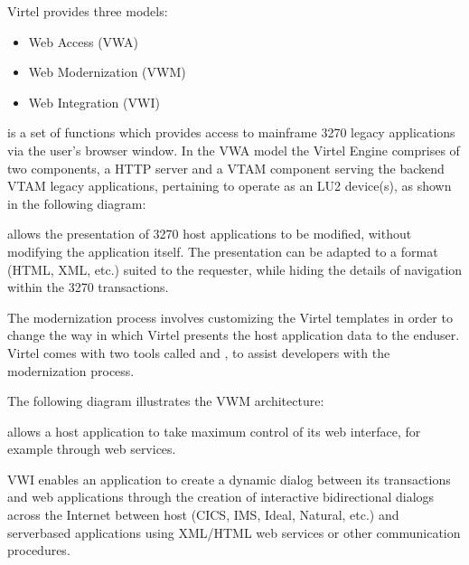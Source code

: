 \documentclass[letterpaper,10pt,english]{sphinxmanual}
\begin{document}
\sphinxAtStartPar
Virtel provides three models:
\begin{itemize}
\item {} 
\sphinxAtStartPar
Web Access (VWA)

\item {} 
\sphinxAtStartPar
Web Modernization (VWM)

\item {} 
\sphinxAtStartPar
Web Integration (VWI)

\end{itemize}

\newpage

\sphinxAtStartPar
{} is a set of functions which provides access to mainframe 3270 legacy applications via the user’s browser window. In the VWA model the Virtel Engine comprises of two components, a HTTP server and a VTAM component serving the back\sphinxhyphen{}end VTAM legacy applications, pertaining to operate as an LU2 device(s), as shown in the following diagram:

\sphinxAtStartPar
{}

\newpage

\sphinxAtStartPar
{} allows the presentation of 3270 host applications to be modified, without modifying the application itself. The presentation can be adapted to a format (HTML, XML, etc.) suited to the requester, while hiding the details of navigation within the 3270 transactions.

\sphinxAtStartPar
The modernization process involves customizing the Virtel templates in order to change the way in which Virtel presents the host application data to the end\sphinxhyphen{}user. Virtel comes with two tools called  and , to assist developers with the modernization process.

\sphinxAtStartPar
The following diagram illustrates the VWM architecture:

\sphinxAtStartPar
{}

\newpage

\sphinxAtStartPar
{} allows a host application to take maximum control of its web interface, for example through web services.

\sphinxAtStartPar
VWI enables an application to create a dynamic dialog between its transactions and web applications through the creation of interactive bidirectional dialogs across the Internet between host (CICS, IMS, Ideal, Natural, etc.) and server\sphinxhyphen{}based applications using XML/HTML web services or other communication procedures.
\end{document}
